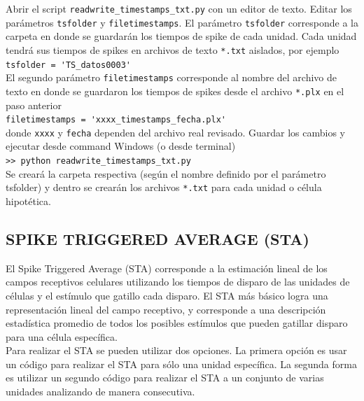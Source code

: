 \documentclass[10pt]{article}
\begin{document}
Abrir el script \verb+readwrite_timestamps_txt.py+ con un editor de texto. Editar los parámetros \verb+tsfolder+ y \verb+filetimestamps+. El parámetro \verb+tsfolder+ corresponde a la carpeta en donde se guardarán los tiempos de spike de cada unidad. Cada unidad tendrá sus tiempos de spikes en archivos de texto \verb+*.txt+ aislados, por ejemplo \\

\verb+tsfolder = 'TS_datos0003'+ \\

El segundo parámetro \verb+filetimestamps+ corresponde al nombre del archivo de texto en donde se guardaron los tiempos de spikes desde el archivo \verb+*.plx+ en el paso anterior \\

\verb+filetimestamps = 'xxxx_timestamps_fecha.plx'+ \\

donde \verb+xxxx+ y \verb+fecha+ dependen del archivo real revisado. Guardar los cambios y ejecutar desde command Windows (o desde terminal)\\

\verb+>> python readwrite_timestamps_txt.py+ \\

Se creará la carpeta respectiva (según el nombre definido por el parámetro tsfolder) y dentro se crearán los archivos \verb+*.txt+ para cada unidad o célula hipotética.\\

\newpage
\subsection{ SPIKE TRIGGERED AVERAGE (STA) }

El Spike Triggered Average (STA) corresponde a la estimación lineal de los campos receptivos celulares utilizando los tiempos de disparo de las unidades de células y el estímulo que gatillo cada disparo. El STA más básico logra una representación lineal del campo receptivo, y corresponde a una descripción estadística promedio de todos los posibles estímulos que pueden gatillar disparo para una célula específica. \\

Para realizar el STA se pueden utilizar dos opciones. La primera opción es usar un código para realizar el STA para sólo una unidad específica. La segunda forma es utilizar un segundo código para realizar el STA a un conjunto de varias unidades analizando de manera consecutiva.  \\
\end{document}
